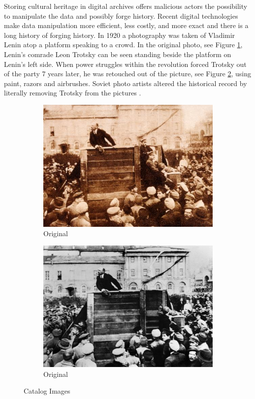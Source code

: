 Storing cultural heritage in digital archives offers malicious actors the possibility to manipulate the data and possibly forge history. Recent digital technologies make data manipulation more efficient, less costly, and more exact and there is a long history of forging history. 
In 1920 a photography was taken of Vladimir Lenin atop a platform speaking to a crowd. In the original photo, see Figure \ref{fig:f1}, Lenin's comrade Leon Trotsky can be seen standing beside the platform on Lenin's left side. When power struggles within the revolution forced Trotsky out of the party 7 years later, he was retouched out of the picture, see Figure \ref{fig:f2}, using paint, razors and airbrushes. Soviet photo artists altered the historical record by literally removing Trotsky from the pictures \cite[3]{hofer2005digital}.

\begin{figure}[h]%
    \centering
    \begin{subfigure}{6cm}
    \includegraphics[width=\linewidth]{graphics/trotzki1.jpg}
    \caption{Original}\label{fig:f1}
    \end{subfigure}
    \qquad
    \begin{subfigure}{6cm}
    \includegraphics[width=\linewidth]{graphics/trotzki2.jpg}
    \caption{Original}\label{fig:f2}
    \end{subfigure}
    \caption{Catalog Images}%
    \label{fig:figure1}%
\end{figure}

